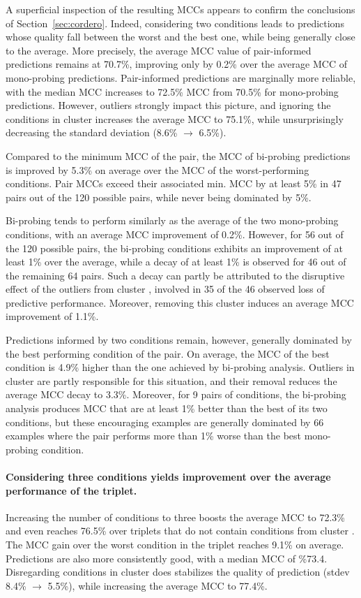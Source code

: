\documentclass[a4,center,fleqn]{NAR}
\begin{document}
A superficial inspection of the resulting MCCs appears to confirm the conclusions of Section~\ref{sec:cordero}. Indeed, considering two conditions leads to predictions whose quality fall between the worst and the best one, while being generally close to the average. More precisely, the average MCC value of pair-informed predictions remains at 70.7\%, improving only by 0.2\% over the average MCC of mono-probing predictions. Pair-informed predictions are marginally more reliable, with the median MCC increases to 72.5\% MCC from 70.5\% for mono-probing predictions. However, outliers strongly impact this picture, and ignoring the conditions in cluster  increases the average MCC to 75.1\%, while unsurprisingly decreasing the standard deviation (8.6\% $\to$ 6.5\%).

Compared to the minimum MCC of the pair, the MCC of bi-probing predictions is improved by 5.3\% on average over the MCC of the worst-performing conditions. Pair MCCs exceed their associated min. MCC by at least 5\% in 47 pairs out of the 120 possible pairs, while never being dominated by 5\%. 

Bi-probing tends to perform similarly as the average of the two mono-probing conditions, with an average MCC improvement of 0.2\%. However, for 56 out of the 120 possible pairs, the bi-probing conditions exhibits an improvement of at least 1\% over the average, while a decay of at least 1\% is observed for 46 out of the remaining 64 pairs. Such a decay can partly be attributed to the disruptive effect of the outliers from cluster , involved in 35 of the 46 observed loss of predictive performance. Moreover, removing this cluster induces an average MCC improvement of 1.1\%.

Predictions informed by two conditions remain, however, generally dominated by the best performing condition of the pair. On average, the MCC of the best condition is 4.9\% higher than the one achieved by bi-probing analysis. 
Outliers in cluster  are partly responsible for this situation, and their removal reduces the average MCC decay to 3.3\%. Moreover, for 9 pairs of conditions, the bi-probing analysis produces MCC that are at least 1\% better than the best of its two conditions, but these encouraging examples are generally dominated by 66 examples where the pair performs more than 1\% worse than the best mono-probing condition.

\paragraph{Considering three conditions yields improvement over the average performance of the triplet.}
Increasing the number of conditions to three boosts the average MCC to 72.3\% and even reaches 76.5\% over triplets that do not contain conditions from cluster . The MCC gain over the worst condition in the triplet reaches 9.1\% on average.  Predictions are also more consistently good, with a median MCC of \%73.4. Disregarding conditions in cluster  does stabilizes the quality of prediction (stdev 8.4\% $\to$ 5.5\%), while increasing the average MCC to 77.4\%.
\end{document}
